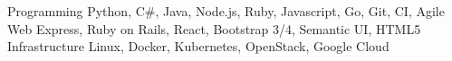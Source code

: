 \begin{cvskills}
  \cvskill
    {Programming}
    {Python, C\#, Java, Node.js, Ruby, Javascript, Go, Git, CI, Agile}
  \cvskill
    {Web}
    {Express, Ruby on Rails, React, Bootstrap 3/4, Semantic UI, HTML5}
  \cvskill
    {Infrastructure}
    {Linux, Docker, Kubernetes, OpenStack, Google Cloud}
\end{cvskills}
